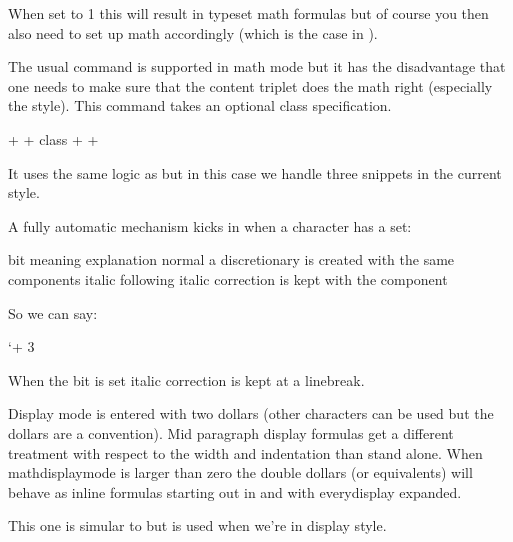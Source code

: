 When set to 1 this will result in  typeset math formulas but of course
you then also need to set up math accordingly (which is the case in \CONTEXT).

\stopnewprimitive

\startnewprimitive[title={\prm {mathdiscretionary}}]

The usual  command is supported in math mode but it has the
disadvantage that one needs to make sure that the content triplet does the math
right (especially the style). This command takes an optional class specification.

\starttyping
\mathdiscretionary                       {+} {+} {+}
\mathdiscretionary class \mathbinarycode {+} {+} {+}
\stoptyping

It uses the same logic as  but in this case we handle three
snippets in the current style.

A fully automatic mechanism kicks in when a character has a  set:

\starttabulate[|c|l|p|]
\FL
\BC bit \BC meaning \BC explanation \NC \NR
\TL
{}   \NC normal  \NC a discretionary is created with the same components \NC \NR
{}   \NC italic  \NC following italic correction is kept with the component \NC \NR
\LL
\stoptabulate

So we can say:

\starttyping
\hmcode `+ 3
\stoptyping

When the  bit is set italic correction is kept at a linebreak.

\stopnewprimitive

\startnewprimitive[title={\prm {mathdisplaymode}}]

Display mode is entered with two dollars (other characters can be used but the
dollars are a convention). Mid paragraph display formulas get a different
treatment with respect to the width and indentation than stand alone. When \prm
{mathdisplaymode} is larger than zero the double dollars (or equivalents) will
behave as inline formulas starting out in  and with \prm
{everydisplay} expanded.

\stopnewprimitive

\startnewprimitive[title={\prm {mathdisplaypenaltyfactor}}]

This one is simular to  but is used when we're in
display style.

\stopnewprimitive

\startnewprimitive[title={\prm {mathdisplayskipmode}}]

